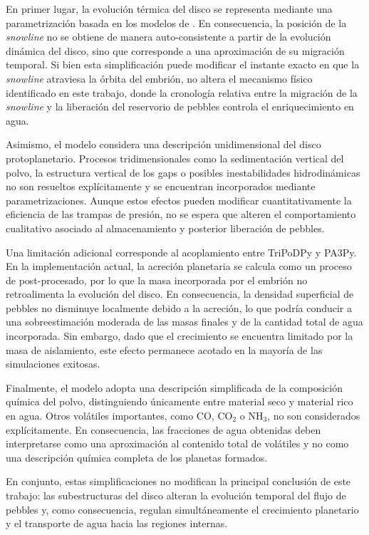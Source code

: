 En primer lugar, la evolución térmica del disco se representa mediante una parametrización basada en los modelos de \citet{Oka2011}. En consecuencia, la posición de la \textit{snowline} no se obtiene de manera auto-consistente a partir de la evolución dinámica del disco, sino que corresponde a una aproximación de su migración temporal. Si bien esta simplificación puede modificar el instante exacto en que la \textit{snowline} atraviesa la órbita del embrión, no altera el mecanismo físico identificado en este trabajo, donde la cronología relativa entre la migración de la \textit{snowline} y la liberación del reservorio de pebbles controla el enriquecimiento en agua.

Asimismo, el modelo considera una descripción unidimensional del disco protoplanetario. Procesos tridimensionales como la sedimentación vertical del polvo, la estructura vertical de los gaps o posibles inestabilidades hidrodinámicas no son resueltos explícitamente y se encuentran incorporados mediante parametrizaciones. Aunque estos efectos pueden modificar cuantitativamente la eficiencia de las trampas de presión, no se espera que alteren el comportamiento cualitativo asociado al almacenamiento y posterior liberación de pebbles.

Una limitación adicional corresponde al acoplamiento entre TriPoDPy y PA3Py. En la implementación actual, la acreción planetaria se calcula como un proceso de post-procesado, por lo que la masa incorporada por el embrión no retroalimenta la evolución del disco. En consecuencia, la densidad superficial de pebbles no disminuye localmente debido a la acreción, lo que podría conducir a una sobreestimación moderada de las masas finales y de la cantidad total de agua incorporada. Sin embargo, dado que el crecimiento se encuentra limitado por la masa de aislamiento, este efecto permanece acotado en la mayoría de las simulaciones exitosas.

Finalmente, el modelo adopta una descripción simplificada de la composición química del polvo, distinguiendo únicamente entre material seco y material rico en agua. Otros volátiles importantes, como CO, CO$_2$ o NH$_3$, no son considerados explícitamente. En consecuencia, las fracciones de agua obtenidas deben interpretarse como una aproximación al contenido total de volátiles y no como una descripción química completa de los planetas formados.

En conjunto, estas simplificaciones no modifican la principal conclusión de este trabajo: las subestructuras del disco alteran la evolución temporal del flujo de pebbles y, como consecuencia, regulan simultáneamente el crecimiento planetario y el transporte de agua hacia las regiones internas.



